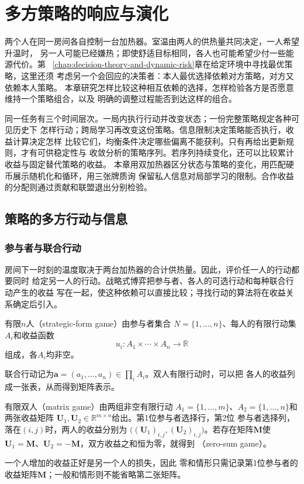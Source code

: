 \chapter{多方策略的响应与演化}
\label{chap:game-theory-and-multi-agent-decision}

两个人在同一房间各自控制一台加热器。室温由两人的供热量共同决定，一人希望升温时，
另一人可能已经嫌热；即使舒适目标相同，各人也可能希望少付一些能源代价。第
~\ref{chap:decision-theory-and-dynamic-risk}章在给定环境中寻找最优策略，这里还须
考虑另一个会回应的决策者：本人最优选择依赖对方策略，对方又依赖本人策略。
本章研究怎样比较这种相互依赖的选择，怎样检验各方是否愿意维持一个策略组合，以及
明确的调整过程能否到达这样的组合。

同一任务有三个时间层次。一局内执行行动并改变状态；一份完整策略规定各种可见历史下
怎样行动；跨局学习再改变这份策略。信息限制决定策略能否执行，收益计算决定怎样
比较它们，均衡条件决定哪些偏离不能获利。只有再给出更新规则，才有可供稳定性与
收敛分析的策略序列。若序列持续变化，还可以比较累计收益与固定替代策略的收益。
本章用双加热器区分状态与策略的变化，用匹配硬币展示随机化和循环，用三张牌质询
保留私人信息对局部学习的限制。合作收益的分配则通过贡献和联盟退出分别检验。

\section{策略的多方行动与信息}
\label{sec:game-actions-information}

\subsection{参与者与联合行动}
\label{sec:game-joint-actions}

房间下一时刻的温度取决于两台加热器的合计供热量。因此，评价任一人的行动都要同时
给定另一人的行动。战略式博弈把参与者、各人的可选行动和每种联合行动产生的收益
写在一起，使这种依赖可以直接比较；寻找行动的算法将在收益关系确定后引入。

\begin{definition}[有限战略式博弈]
\label{def:game-finite-strategic-game}
有限\(n\)人（strategic-form game）由参与者集合
\(N=\{1,\ldots,n\}\)、每人的有限行动集\(A_i\)和收益函数
\[
  u_i:A_1\times\cdots\times A_n\to\mathbb{R}
\]
组成，各$A_i$均非空。
\end{definition}

联合行动记为\(\bm a=(a_1,\ldots,a_n)\in\prod_i A_i\)。双人有限行动时，可以把
各人的收益列成一张表，从而得到矩阵表示。
\begin{definition}[有限矩阵博弈]
\label{def:game-finite-matrix-game}
有限双人（matrix game）由两组非空有限行动
\(A_1=\{1,\ldots,m\}\)、\(A_2=\{1,\ldots,n\}\)和两张收益矩阵
\(\bm{U}_1,\bm{U}_2\in\mathbb{R}^{m\times n}\)给出。第1位参与者选择行，第2位
参与者选择列，落在\((i,j)\)时，两人的收益分别为
\(\bigl((\bm{U}_1)_{i,j},(\bm{U}_2)_{i,j}\bigr)\)。若存在矩阵\(\bm{M}\)使
\(\bm{U}_1=\bm{M}\)、\(\bm{U}_2=-\bm{M}\)，双方收益之和恒为零，就得到
（zero-sum game）。
\end{definition}
一个人增加的收益正好是另一个人的损失，因此
零和情形只需记录第1位参与者的收益矩阵\(\bm{M}\)；一般和情形则不能省略第二张矩阵。

